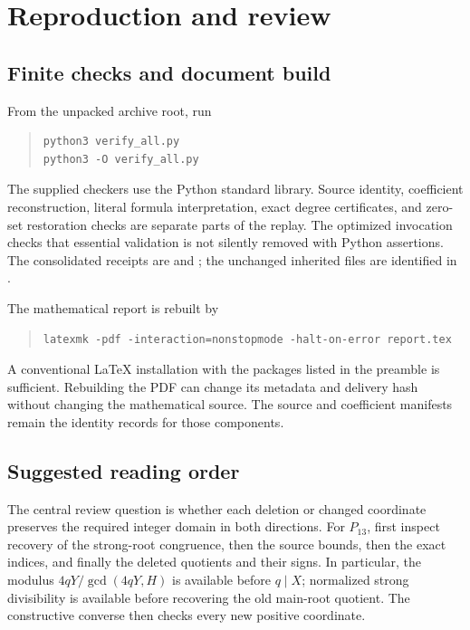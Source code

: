 \documentclass[11pt,a4paper]{article}
\theoremstyle{definition}
\begin{document}
\section{Reproduction and review}
\label{sec:reproduction}

\subsection{Finite checks and document build}

From the unpacked archive root, run
\begin{quote}
\small
\begin{verbatim}
python3 verify_all.py
python3 -O verify_all.py
\end{verbatim}
\end{quote}
The supplied checkers use the Python standard library.  Source identity,
coefficient reconstruction, literal formula interpretation, exact
degree certificates, and zero-set restoration checks are separate
parts of the replay.  The optimized invocation checks that essential
validation is not silently removed with Python assertions.
The consolidated receipts are  and
; the unchanged inherited files are
identified in .

The mathematical report is rebuilt by
\begin{quote}
\small
\begin{verbatim}
latexmk -pdf -interaction=nonstopmode -halt-on-error report.tex
\end{verbatim}
\end{quote}
A conventional LaTeX installation with the packages listed in the
preamble is sufficient.  Rebuilding the PDF can change its metadata
and delivery hash without changing the mathematical source.  The
source and coefficient manifests remain the identity records for
those components.

\subsection{Suggested reading order}

The central review question is whether each deletion or changed
coordinate preserves the required integer domain in both directions.
For \(P_{13}\), first inspect recovery of the strong-root congruence,
then the source bounds, then the exact indices, and finally the deleted
quotients and their signs.
In particular, the modulus \(4qY/\gcd(4qY,H)\) is available before
\(q\mid X\); normalized strong divisibility is available before
recovering the old main-root quotient.  The constructive converse
then checks every new positive coordinate.
\end{document}
